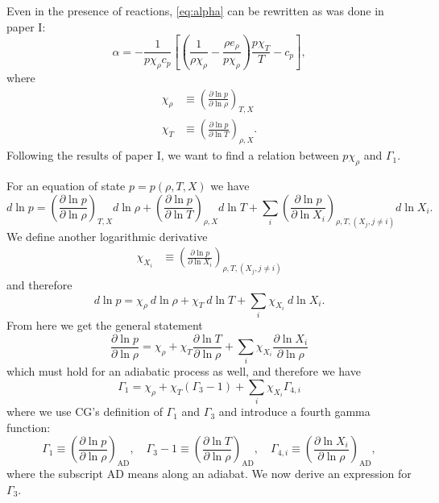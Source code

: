 Even in the presence of reactions, \eqref{eq:alpha} can be rewritten
as was done in paper I:
\begin{equation}\label{eq:alpha2}
\alpha = -\frac{1}{p\chi_\rho c_p}\left[\left(\frac{1}{\rho\chi_\rho}
- \frac{\rho e_\rho}{p\chi_\rho}\right)\frac{p\chi_T}{T} - c_p\right],
\end{equation}
where
\begin{align*}
\chi_{\rho} &\equiv \left(\frac{\partial\ln p}{\partial\ln\rho}
\right)_{T,X} \\
\chi_{T} &\equiv \left(\frac{\partial\ln p}{\partial\ln T}
\right)_{\rho,X}.
\end{align*}
Following the results of paper I, we want to find a relation
between $p\chi_\rho$ and $\Gamma_1$.

For an equation of state $p=p(\rho,T,X)$ we have
\[
d\ln p = \left(\frac{\partial\ln p}{\partial\ln\rho}\right)_{T,X}d\ln\rho +
\left(\frac{\partial\ln p}{\partial\ln T}\right)_{\rho,X}d\ln T +
\sum_i\left(\frac{\partial\ln p}{\partial\ln X_i}\right)_{\rho,T,(X_j,j
\neq i)} d\ln X_i.
\]
We define another logarithmic derivative
\begin{align*}
\chi_{X_{i}} &\equiv \left(\frac{\partial\ln p}{\partial\ln X_i}
\right)_{\rho,T,(X_j,j\neq i)}
\end{align*}
and therefore
\[
d\ln p = \chi_\rho \ d\ln\rho + \chi_T \ d\ln T + \sum_i \chi_{X_i}\ 
d\ln X_i.
\]
From here we get the general statement 
\[
\frac{\partial\ln p}{\partial \ln \rho} = \chi_\rho + 
\chi_T\frac{\partial \ln T}{\partial\ln \rho} +
\sum_i\chi_{X_i}\frac{\partial\ln X_i}{\partial\ln \rho}
\]
which must hold for an adiabatic process as well, and therefore we have
\begin{equation}\label{eq:gamma1}
  \Gamma_1 = \chi_\rho + \chi_T\left(\Gamma_3-1\right) 
  + \sum_i\chi_{X_i}\Gamma_{4,i}
\end{equation}
where we use CG's definition of $\Gamma_1$ and $\Gamma_3$ and introduce a 
fourth gamma function:
\[
\Gamma_1 \equiv \left(
\frac{\partial \ln p}{\partial \ln \rho}\right)_{\text{AD}},\quad
\Gamma_3-1\equiv \left(
\frac{\partial \ln T}{\partial \ln \rho}\right)_{\text{AD}},\quad
\Gamma_{4,i}\equiv \left(
\frac{\partial\ln X_i}{\partial\ln\rho}\right)_{\text{AD}},
\]
where the subscript AD means along an adiabat.  We now derive an expression
for $\Gamma_3$.
  
